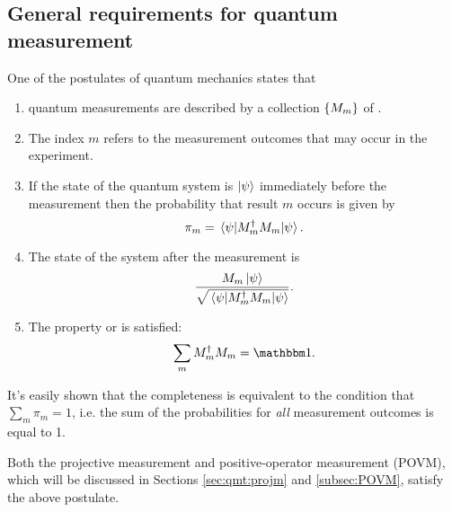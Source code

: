 \subsection{General requirements for quantum measurement}\label{sec:qmt:postulate}

One of the postulates of quantum mechanics \parencite[.3]{NielsenChuang}
states that
\begin{enumerate}
  \item
    quantum measurements are described by a collection
    $\left\{M_m\right\}$ of .
  \item
    The index $m$ refers to the measurement outcomes that
    may occur in the experiment.
  \item
    If the state of the quantum system is $\ket{\psi}$
    immediately before the measurement then the probability that result $m$ occurs is
    given by
    \begin{equation}\label{eq:qmt:postulate:prob}
      \pi_{m} = \ev{M^{\dagger}_{m} M_{m}}{\psi} \text{.}
    \end{equation}
  \item
    The state of the system after the measurement is
    \begin{equation}\label{eq:qmt:postulate:after}
      \frac{ M_m \ket{\psi} }{ \sqrt{\ev{M^{\dagger}_{m} M_{m}}{\psi}} } \text{.}
    \end{equation}
  \item
    The  property or  is satisfied:
    \begin{equation}\label{eq:qmt:postulate:completeness}
      \sum_m M_m^{\dagger} M_m = \idop \text{.}
    \end{equation}
\end{enumerate}

It's easily shown that the completeness is equivalent to the condition that
$\sum_m \pi_m = 1$, i.e. the sum of the probabilities for \emph{all} measurement outcomes is equal to 1.

Both the projective measurement and positive-operator measurement (POVM),
which will be discussed in Sections \ref{sec:qmt:projm} and \ref{subsec:POVM},
satisfy the above postulate.